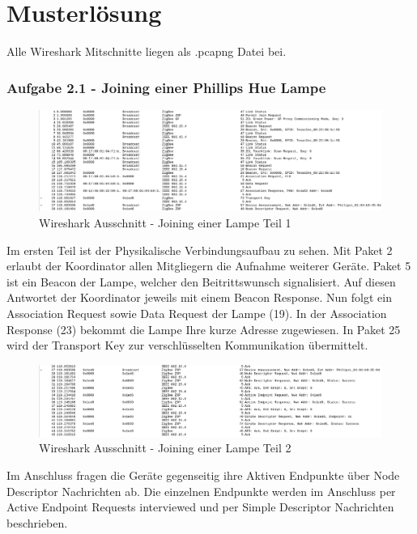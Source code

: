 \chapter{Musterlösung}

Alle Wireshark Mitschnitte liegen als \grqq *.pcapng \grqq{} Datei bei.

\subsection{Aufgabe 2.1 - Joining einer Phillips Hue Lampe}

\begin{figure}[H]
    \centering
    \includegraphics[width=1\textwidth]{media/lsg2.1-1.png}
    \caption{Wireshark Ausschnitt - Joining einer Lampe Teil 1}
\end{figure}

Im ersten Teil ist der Physikalische Verbindungsaufbau zu sehen. Mit Paket 2 erlaubt der Koordinator
allen Mitgliegern die Aufnahme weiterer Geräte. Paket 5 ist ein Beacon der Lampe, welcher den Beitrittswunsch
signalisiert. Auf diesen Antwortet der Koordinator jeweils mit einem Beacon Response. Nun folgt ein Association
Request sowie Data Request der Lampe (19). In der Association Response (23) bekommt die Lampe
Ihre kurze Adresse zugewiesen. In Paket 25 wird der Transport Key zur verschlüsselten Kommunikation 
übermittelt.

\begin{figure}[H]
    \centering
    \includegraphics[width=1\textwidth]{media/lsg2.1-2.png}
    \caption{Wireshark Ausschnitt - Joining einer Lampe Teil 2}
\end{figure}

Im Anschluss fragen die Geräte gegenseitig ihre Aktiven Endpunkte über \grqq Node Descriptor\grqq{} Nachrichten ab. Die einzelnen Endpunkte werden im Anschluss per \grqq 
Active Endpoint Requests\grqq{} interviewed und per \grqq Simple Descriptor\grqq{} Nachrichten beschrieben.

